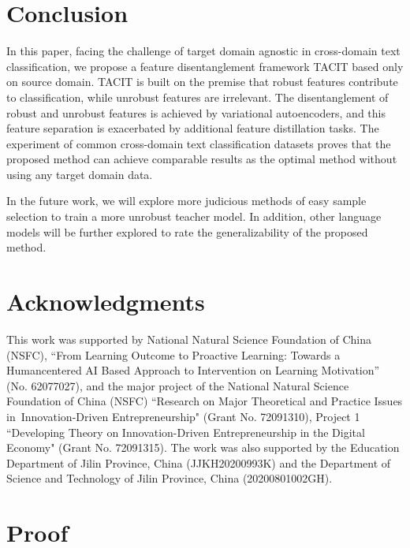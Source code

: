 \documentclass[letterpaper]{article} %
\begin{document}
\section{Conclusion}
In this paper, facing the challenge of target domain agnostic in cross-domain text classification, we propose a feature disentanglement framework TACIT based only on source domain. TACIT is built on the premise that robust features contribute to classification, while unrobust features are irrelevant. The disentanglement of robust and unrobust features is achieved by variational autoencoders, and this feature separation is exacerbated by additional feature distillation tasks. The experiment of common cross-domain text classification datasets proves that the proposed method can achieve comparable results as the optimal method without using any target domain data. 

In the future work, we will explore more judicious methods of easy sample selection to train a more unrobust teacher model. In addition, other language models will be further explored to rate the generalizability of the proposed method. 

\clearpage
\section{Acknowledgments}
This work was supported by National Natural Science Foundation of China (NSFC), ``From Learning Outcome to Proactive Learning: Towards a Humancentered AI Based Approach to Intervention on Learning Motivation” (No. 62077027), and the major project of the National Natural Science Foundation of China (NSFC) ``Research on Major Theoretical and Practice Issues in Innovation-Driven Entrepreneurship" (Grant No. 72091310), Project 1 ``Developing Theory on Innovation-Driven Entrepreneurship in the Digital Economy" (Grant No. 72091315). The work was also supported by the Education Department of Jilin Province, China (JJKH20200993K) and the Department of Science and Technology of Jilin Province, China (20200801002GH).



\clearpage

\appendix
\section{Proof} \label{app:a}
\end{document}

